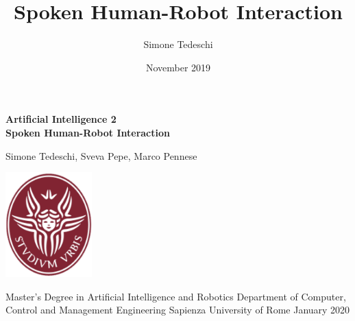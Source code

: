 \documentclass[12pt, a4paper]{article}
\author{Simone Tedeschi}
\title{Spoken Human-Robot Interaction}
\date{November 2019}
\begin{document}

\begin{titlepage}
    \begin{center}
        \vspace*{1cm}
        
        \LARGE
        \textbf{Artificial Intelligence 2 \\Spoken Human-Robot Interaction}
        
        
        \vspace{1.5cm}
        \Large
        Simone Tedeschi, Sveva Pepe, Marco Pennese
        
        \vfill
        
        \includegraphics[width=0.25\textwidth]{sapienza_logo.png}

        \vfill
        
        \large
        Master's Degree in Artificial Intelligence and Robotics\break\break
        Department of Computer, Control and Management Engineering\break\break
        Sapienza University of Rome\break\break
        January 2020

    \end{center}
\end{titlepage}



\pagebreak
\setcounter{page}{0}
\tableofcontents
\pagebreak
\end{document}
